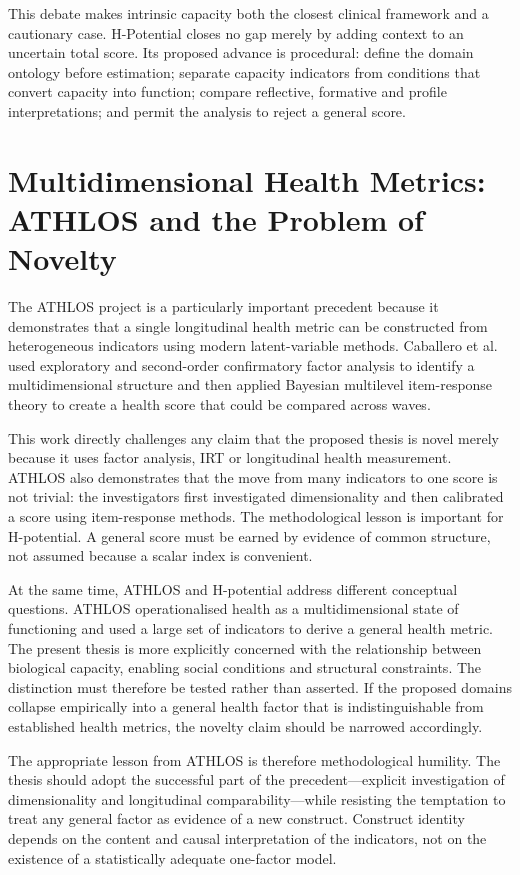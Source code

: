 This debate makes intrinsic capacity both the closest clinical framework and a
cautionary case. H-Potential closes no gap merely by adding context to an
uncertain total score. Its proposed advance is procedural: define the domain
ontology before estimation; separate capacity indicators from conditions that
convert capacity into function; compare reflective, formative and profile
interpretations; and permit the analysis to reject a general score.

\section{Multidimensional Health Metrics: ATHLOS and the Problem of Novelty}

The ATHLOS project is a particularly important precedent because it demonstrates that a single longitudinal health metric can be constructed from heterogeneous indicators using modern latent-variable methods. Caballero et al. used exploratory and second-order confirmatory factor analysis to identify a multidimensional structure and then applied Bayesian multilevel item-response theory to create a health score that could be compared across waves. \cite{caballero_athlos_2017}

This work directly challenges any claim that the proposed thesis is novel merely because it uses factor analysis, IRT or longitudinal health measurement. ATHLOS also demonstrates that the move from many indicators to one score is not trivial: the investigators first investigated dimensionality and then calibrated a score using item-response methods. The methodological lesson is important for H-potential. A general score must be earned by evidence of common structure, not assumed because a scalar index is convenient.

At the same time, ATHLOS and H-potential address different conceptual questions. ATHLOS operationalised health as a multidimensional state of functioning and used a large set of indicators to derive a general health metric. The present thesis is more explicitly concerned with the relationship between biological capacity, enabling social conditions and structural constraints. The distinction must therefore be tested rather than asserted. If the proposed domains collapse empirically into a general health factor that is indistinguishable from established health metrics, the novelty claim should be narrowed accordingly.

The appropriate lesson from ATHLOS is therefore methodological humility. The thesis should adopt the successful part of the precedent---explicit investigation of dimensionality and longitudinal comparability---while resisting the temptation to treat any general factor as evidence of a new construct. Construct identity depends on the content and causal interpretation of the indicators, not on the existence of a statistically adequate one-factor model.


